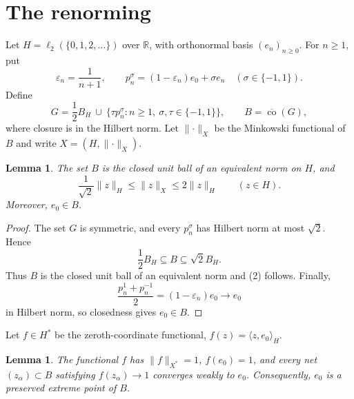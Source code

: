 \documentclass[11pt]{article}
\newtheorem{lemma}[theorem]{Lemma}
\newcommand{\R}{\mathbb{R}}
\begin{document}
\section{The renorming}

Let $H=\ell_2(\{0,1,2,\ldots\})$ over $\R$, with orthonormal basis
$(e_n)_{n\geq0}$.  For $n\geq1$, put
\[
 \varepsilon_n=\frac1{n+1},
 \qquad
 p_n^{\sigma}=(1-\varepsilon_n)e_0+\sigma e_n
 \quad(\sigma\in\{-1,1\}).
\]
Define
\[
 G=\frac12 B_H\ \cup\
   \{\tau p_n^{\sigma}:n\geq1,\ \sigma,\tau\in\{-1,1\}\},
 \qquad
 B=\overline{\operatorname{co}}(G),
 \tag{1}
\]
where closure is in the Hilbert norm.  Let $\lVert\cdot\rVert_X$ be the
Minkowski functional of $B$ and write $X=(H,\lVert\cdot\rVert_X)$.

\begin{lemma}\label{lem:norm}
The set $B$ is the closed unit ball of an equivalent norm on $H$, and
\[
 \frac1{\sqrt2}\lVert z\rVert_H
 \leq \lVert z\rVert_X
 \leq 2\lVert z\rVert_H
 \qquad(z\in H).
 \tag{2}
\]
Moreover, $e_0\in B$.
\end{lemma}

\begin{proof}
The set $G$ is symmetric, and every $p_n^\sigma$ has Hilbert norm at most
$\sqrt2$.  Hence
\[
 \frac12B_H\subseteq B\subseteq\sqrt2B_H.
\]
Thus $B$ is the closed unit ball of an equivalent norm and (2) follows.
Finally,
\[
 \frac{p_n^1+p_n^{-1}}2=(1-\varepsilon_n)e_0
 \longrightarrow e_0
\]
in Hilbert norm, so closedness gives $e_0\in B$.
\end{proof}

Let $f\in H^*$ be the zeroth-coordinate functional,
$f(z)=\langle z,e_0\rangle_H$.

\begin{lemma}\label{lem:preserved}
The functional $f$ has $\lVert f\rVert_{X^*}=1$, $f(e_0)=1$, and every net
$(z_\alpha)\subset B$ satisfying $f(z_\alpha)\to1$ converges weakly to
$e_0$.  Consequently, $e_0$ is a preserved extreme point of $B$.
\end{lemma}
\end{document}
